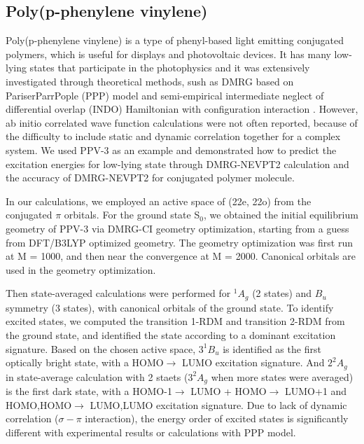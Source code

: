 \subsection{Poly(p-phenylene vinylene)}

Poly(p-phenylene vinylene) is a type of phenyl-based light emitting conjugated polymers, which is useful for displays and photovoltaic devices. It has many low-lying states that participate in the photophysics and it was extensively investigated through theoretical methods, sush as DMRG based on Pariser\textendash Parr\textendash Pople (PPP) model \cite{shukla_correlated_2002}\cite{bursill_symmetry-adapted_2009} and semi-empirical intermediate neglect of differential overlap (INDO) Hamiltonian with configuration interaction \cite{beljonne_theoretical_1995}. 
However, ab initio correlated wave function calculations were not often reported, because of the difficulty to include static and dynamic correlation together for a complex system.
We used PPV-3 as an example and demonstrated how to predict the excitation energies for low-lying state through DMRG-NEVPT2 calculation and the accuracy of DMRG-NEVPT2 for conjugated polymer molecule.

In our calculations, we employed an active space of (22e, 22o) from the conjugated $\pi$ orbitals. For the ground state S$_{0}$, we obtained the initial equilibrium geometry of PPV-3 via DMRG-CI geometry optimization, starting from a guess from DFT/B3LYP optimized geometry. The geometry optimization was first run at M = 1000, and then near the convergence at M = 2000. Canonical orbitals are used in the geometry optimization.

Then state-averaged calculations were performed for $^1A_g$ (2 states) and $B_u$ symmetry (3 states), with canonical orbitals of the ground state. 
To identify excited states, we computed the transition 1-RDM and transition 2-RDM from the ground state, and identified the state according to a dominant excitation signature.
Based on the chosen active space, $3^1B_u$ is identified as the first optically bright state, with a HOMO$\rightarrow$ LUMO excitation signature. And $2^2A_g$ in state-average calculation with 2 staets ($3^2A_g$ when more states were averaged) is the first dark state, with a HOMO-1$\rightarrow$ LUMO + HOMO$\rightarrow$ LUMO+1 and HOMO,HOMO$\rightarrow$ LUMO,LUMO excitation signature.
Due to lack of dynamic correlation ($\sigma-\pi$ interaction), the energy order of excited states is significantly different with experimental results or calculations with PPP model.


